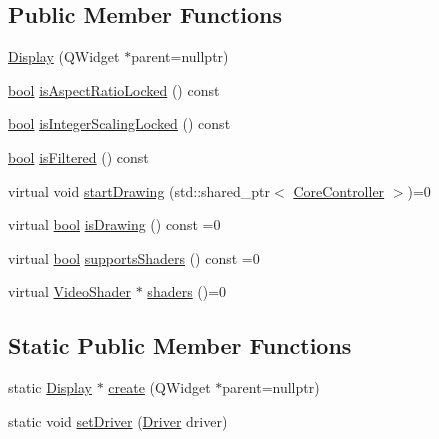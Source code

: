 \subsection*{Public Member Functions}
\begin{DoxyCompactItemize}
\item 
\mbox{\hyperlink{class_q_g_b_a_1_1_display_a751b596b9c83d0f05c41e7bdb85d92e6}{Display}} (Q\+Widget $\ast$parent=nullptr)
\item 
\mbox{\hyperlink{libretro_8h_a4a26dcae73fb7e1528214a068aca317e}{bool}} \mbox{\hyperlink{class_q_g_b_a_1_1_display_a3faa159946cd55ef4696cd2e7585ac42}{is\+Aspect\+Ratio\+Locked}} () const
\item 
\mbox{\hyperlink{libretro_8h_a4a26dcae73fb7e1528214a068aca317e}{bool}} \mbox{\hyperlink{class_q_g_b_a_1_1_display_a91092d6e566e11d38500912c09429ae2}{is\+Integer\+Scaling\+Locked}} () const
\item 
\mbox{\hyperlink{libretro_8h_a4a26dcae73fb7e1528214a068aca317e}{bool}} \mbox{\hyperlink{class_q_g_b_a_1_1_display_a412ea3446aa7d96262999511ffb176eb}{is\+Filtered}} () const
\item 
virtual void \mbox{\hyperlink{class_q_g_b_a_1_1_display_aa644c73fb7482b0d17be7ee88dae3fd0}{start\+Drawing}} (std\+::shared\+\_\+ptr$<$ \mbox{\hyperlink{class_q_g_b_a_1_1_core_controller}{Core\+Controller}} $>$)=0
\item 
virtual \mbox{\hyperlink{libretro_8h_a4a26dcae73fb7e1528214a068aca317e}{bool}} \mbox{\hyperlink{class_q_g_b_a_1_1_display_ace6799f5c31d1736c92033b2cf4daa31}{is\+Drawing}} () const =0
\item 
virtual \mbox{\hyperlink{libretro_8h_a4a26dcae73fb7e1528214a068aca317e}{bool}} \mbox{\hyperlink{class_q_g_b_a_1_1_display_a25a97e9613c47c57a0b436d33c10380f}{supports\+Shaders}} () const =0
\item 
virtual \mbox{\hyperlink{video-backend_8h_struct_video_shader}{Video\+Shader}} $\ast$ \mbox{\hyperlink{class_q_g_b_a_1_1_display_a540a06ee94dbfcd93fb1b2a7e2d0bbf8}{shaders}} ()=0
\end{DoxyCompactItemize}
\subsection*{Static Public Member Functions}
\begin{DoxyCompactItemize}
\item 
static \mbox{\hyperlink{class_q_g_b_a_1_1_display}{Display}} $\ast$ \mbox{\hyperlink{class_q_g_b_a_1_1_display_ac087fa395a544edb1e473e9d7c39d195}{create}} (Q\+Widget $\ast$parent=nullptr)
\item 
static void \mbox{\hyperlink{class_q_g_b_a_1_1_display_a4b8340f7f99e587acb59e1cc6a0ef1ca}{set\+Driver}} (\mbox{\hyperlink{class_q_g_b_a_1_1_display_a43f4be6bd7830df1380fcc10165488d0}{Driver}} driver)
\end{DoxyCompactItemize}
